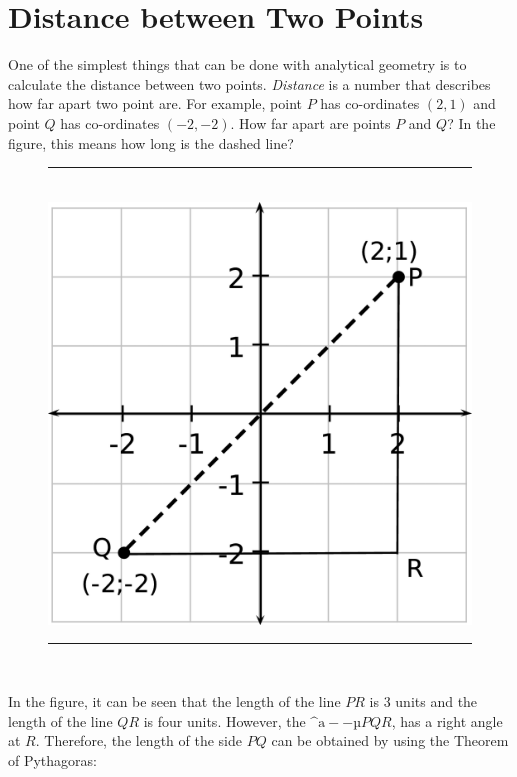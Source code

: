             \section{ Distance between Two Points}
            \nopagebreak
            \label{m39107*id66786}One of the simplest things that can be done with analytical geometry is to calculate the distance between two points. \textsl{Distance} is a number that describes how far apart two point are. For example, point $P$ has co-ordinates $\left(2,1\right)$ and point $Q$ has co-ordinates $\left(-2,-2\right)$. How far apart are points $P$ and $Q$? In the figure, this means how long is the dashed line?\par 
    \setcounter{subfigure}{0}
	\begin{figure}[H] %
    \begin{center}
    \rule[.1in]{\figurerulewidth}{.005in} \\
        \label{m39107*uid38!!!underscore!!!media}\label{m39107*uid38!!!underscore!!!printimage}\includegraphics[width=0.5\columnwidth]{col11306.imgs/m39107_MG10C14_015.png} %
      \vspace{2pt}
    \vspace{.1in}
    \rule[.1in]{\figurerulewidth}{.005in} \\
    \end{center}
 \end{figure}       
        \label{m39107*id66883}In the figure, it can be seen that the length of the line $PR$ is 3 units and the length of the line $QR$ is four units. However, the $\mathrm{\^{a}--µ}PQR$, has a right angle at $R$. Therefore, the length of the side $PQ$ can be obtained by using the Theorem of Pythagoras:\par 
        \label{m39107*id66950}\nopagebreak\noindent{}
